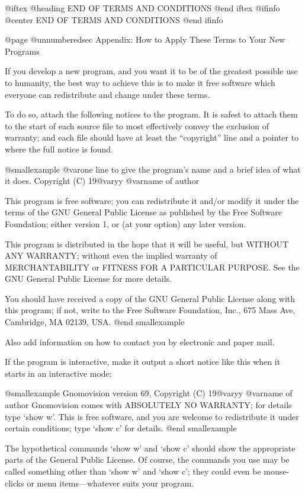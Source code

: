 @iftex
@heading END OF TERMS AND CONDITIONS
@end iftex
@ifinfo
@center END OF TERMS AND CONDITIONS
@end ifinfo

@page
@unnumberedsec Appendix: How to Apply These Terms to Your New Programs

  If you develop a new program, and you want it to be of the greatest
possible use to humanity, the best way to achieve this is to make it
free software which everyone can redistribute and change under these
terms.

  To do so, attach the following notices to the program.  It is safest to
attach them to the start of each source file to most effectively convey
the exclusion of warranty; and each file should have at least the
``copyright'' line and a pointer to where the full notice is found.

@smallexample
@var{one line to give the program's name and a brief idea of what it does.}
Copyright (C) 19@var{yy}  @var{name of author}

This program is free software; you can redistribute it and/or modify
it under the terms of the GNU General Public License as published by
the Free Software Foundation; either version 1, or (at your option)
any later version.

This program is distributed in the hope that it will be useful,
but WITHOUT ANY WARRANTY; without even the implied warranty of
MERCHANTABILITY or FITNESS FOR A PARTICULAR PURPOSE.  See the
GNU General Public License for more details.

You should have received a copy of the GNU General Public License
along with this program; if not, write to the Free Software
Foundation, Inc., 675 Mass Ave, Cambridge, MA 02139, USA.
@end smallexample

Also add information on how to contact you by electronic and paper mail.

If the program is interactive, make it output a short notice like this
when it starts in an interactive mode:

@smallexample
Gnomovision version 69, Copyright (C) 19@var{yy} @var{name of author}
Gnomovision comes with ABSOLUTELY NO WARRANTY; for details type `show w'.
This is free software, and you are welcome to redistribute it
under certain conditions; type `show c' for details.
@end smallexample

The hypothetical commands `show w' and `show c' should show the
appropriate parts of the General Public License.  Of course, the
commands you use may be called something other than `show w' and `show
c'; they could even be mouse-clicks or menu items---whatever suits your
program.

